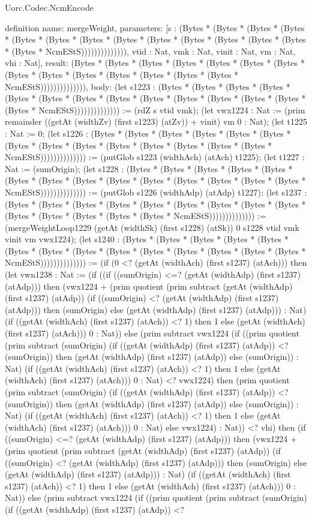 \begin{lexlean}{Uorc.Codec.NcmEncode}
\begin{semanticmodule}
definition{
  name: mergeWeight,
  parameters: [s : (Bytes * (Bytes * (Bytes * (Bytes * (Bytes * (Bytes * (Bytes * (Bytes * (Bytes * (Bytes * (Bytes * (Bytes * (Bytes * (Bytes * NcmEStS)))))))))))))), vtid : Nat, vmk : Nat, vinit : Nat, vm : Nat, vhi : Nat],
  result: (Bytes * (Bytes * (Bytes * (Bytes * (Bytes * (Bytes * (Bytes * (Bytes * (Bytes * (Bytes * (Bytes * (Bytes * (Bytes * (Bytes * NcmEStS)))))))))))))),
  body: (let s1223 : (Bytes * (Bytes * (Bytes * (Bytes * (Bytes * (Bytes * (Bytes * (Bytes * (Bytes * (Bytes * (Bytes * (Bytes * (Bytes * (Bytes * NcmEStS)))))))))))))) := (rdZ s vtid vmk); (let vwx1224 : Nat := (prim remainder ((getAt (widthZv) (first s1223) (atZv)) + vinit) vm 0 : Nat); (let t1225 : Nat := 0; (let s1226 : (Bytes * (Bytes * (Bytes * (Bytes * (Bytes * (Bytes * (Bytes * (Bytes * (Bytes * (Bytes * (Bytes * (Bytes * (Bytes * (Bytes * NcmEStS)))))))))))))) := (putGlob s1223 (widthAch) (atAch) t1225); (let t1227 : Nat := (sumOrigin); (let s1228 : (Bytes * (Bytes * (Bytes * (Bytes * (Bytes * (Bytes * (Bytes * (Bytes * (Bytes * (Bytes * (Bytes * (Bytes * (Bytes * (Bytes * NcmEStS)))))))))))))) := (putGlob s1226 (widthAdp) (atAdp) t1227); (let s1237 : (Bytes * (Bytes * (Bytes * (Bytes * (Bytes * (Bytes * (Bytes * (Bytes * (Bytes * (Bytes * (Bytes * (Bytes * (Bytes * (Bytes * NcmEStS)))))))))))))) := (mergeWeightLoop1229 (getAt (widthSk) (first s1228) (atSk)) 0 s1228 vtid vmk vinit vm vwx1224); (let s1240 : (Bytes * (Bytes * (Bytes * (Bytes * (Bytes * (Bytes * (Bytes * (Bytes * (Bytes * (Bytes * (Bytes * (Bytes * (Bytes * (Bytes * NcmEStS)))))))))))))) := (if (0 <? (getAt (widthAch) (first s1237) (atAch))) then (let vwn1238 : Nat := (if ((if ((sumOrigin) <=? (getAt (widthAdp) (first s1237) (atAdp))) then (vwx1224 + (prim quotient (prim subtract (getAt (widthAdp) (first s1237) (atAdp)) (if ((sumOrigin) <? (getAt (widthAdp) (first s1237) (atAdp))) then (sumOrigin) else (getAt (widthAdp) (first s1237) (atAdp))) : Nat) (if ((getAt (widthAch) (first s1237) (atAch)) <? 1) then 1 else (getAt (widthAch) (first s1237) (atAch))) 0 : Nat)) else (prim subtract vwx1224 (if ((prim quotient (prim subtract (sumOrigin) (if ((getAt (widthAdp) (first s1237) (atAdp)) <? (sumOrigin)) then (getAt (widthAdp) (first s1237) (atAdp)) else (sumOrigin)) : Nat) (if ((getAt (widthAch) (first s1237) (atAch)) <? 1) then 1 else (getAt (widthAch) (first s1237) (atAch))) 0 : Nat) <? vwx1224) then (prim quotient (prim subtract (sumOrigin) (if ((getAt (widthAdp) (first s1237) (atAdp)) <? (sumOrigin)) then (getAt (widthAdp) (first s1237) (atAdp)) else (sumOrigin)) : Nat) (if ((getAt (widthAch) (first s1237) (atAch)) <? 1) then 1 else (getAt (widthAch) (first s1237) (atAch))) 0 : Nat) else vwx1224) : Nat)) <? vhi) then (if ((sumOrigin) <=? (getAt (widthAdp) (first s1237) (atAdp))) then (vwx1224 + (prim quotient (prim subtract (getAt (widthAdp) (first s1237) (atAdp)) (if ((sumOrigin) <? (getAt (widthAdp) (first s1237) (atAdp))) then (sumOrigin) else (getAt (widthAdp) (first s1237) (atAdp))) : Nat) (if ((getAt (widthAch) (first s1237) (atAch)) <? 1) then 1 else (getAt (widthAch) (first s1237) (atAch))) 0 : Nat)) else (prim subtract vwx1224 (if ((prim quotient (prim subtract (sumOrigin) (if ((getAt (widthAdp) (first s1237) (atAdp)) <? }
\end{semanticmodule}
\end{lexlean}
